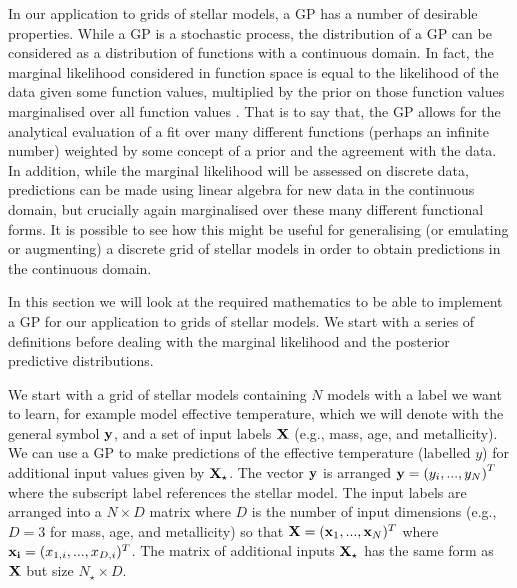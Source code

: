 In our application to grids of stellar models,  a GP has a number of desirable properties.  While a GP is a stochastic process, the distribution of a GP can be considered as a distribution of functions with a continuous domain.  In fact,  the marginal likelihood considered in function space is equal to the likelihood of the data given some function values,  multiplied by the prior on those function values marginalised over all function values \cite{williams1996gaussian}.  That is to say that, the GP allows for the analytical evaluation of a fit over many different functions (perhaps an infinite number) weighted by some concept of a prior and the agreement with the data.   In addition,  while the marginal likelihood will be assessed on discrete data,  predictions can be made using linear algebra for new data in the continuous domain, but crucially again marginalised over these many different functional forms.  It is possible to see how this might be useful for generalising (or emulating or augmenting) a discrete grid of stellar models in order to obtain predictions in the continuous domain.

In this section we will look at the required mathematics to be able to implement a GP for our application to grids of stellar models.  We start with a series of definitions before dealing with the marginal likelihood and the posterior predictive distributions. 

We start with a grid of stellar models containing $N$ models with a label we want to learn, for example model effective temperature, which we will denote with the general symbol $\bf y$, and a set of input labels $\bf X$ (e.g., mass, age, and metallicity).  We can use a GP to make predictions of the effective temperature (labelled $y$) for additional input values given by $\bf X_{\star}$.  The vector $\bf y$ is arranged ${\bf y} = \left(y_{i}, ... ,y_{N} \right)^{T}$ where the subscript label references the stellar model.  The input labels are arranged into a $N \times D$ matrix where $D$ is the number of input dimensions (e.g., $D=3$ for mass, age, and metallicity) so that ${\bf X} = ({\bf x}_{1}, ..., {\bf x}_{N})^{T}$ where ${\bf x_{i}} = (x_{1, i}, ..., x_{D, i})^{T}$.  The matrix of additional inputs $\bf X_{\star}$ has the same form as $\bf X$ but size $N_{\star} \times D$.


